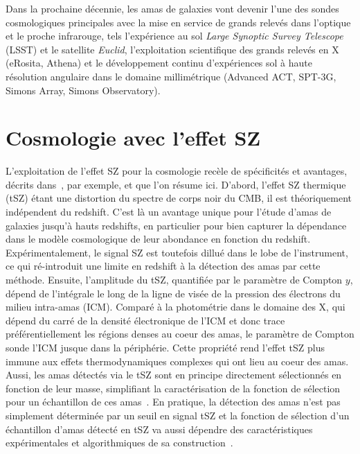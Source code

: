 Dans la prochaine décennie, les amas de galaxies vont devenir l'une
des sondes cosmologiques principales avec la mise en service de grands
relevés dans l'optique et le proche infrarouge, tels l'expérience au
sol \emph{Large Synoptic Survey Telescope} (LSST) et le satellite
\emph{Euclid}, l'exploitation scientifique des grands relevés en X
(eRosita, Athena) et le développement continu d'expériences sol à
haute résolution angulaire dans le domaine millimétrique (Advanced
ACT, SPT-3G, Simons Array, Simons Observatory). 


\section{Cosmologie avec l'effet SZ}
\label{se:cosmo_sz}

L'exploitation de l'effet SZ pour la cosmologie recèle de spécificités
et avantages, décrits dans~\citet{Carlstrom2002}, par exemple, et que
l'on résume ici. D'abord, l'effet SZ thermique (tSZ)
étant une distortion du spectre de corps noir du CMB, il est
théoriquement indépendent du redshift. C'est là un avantage unique
pour l'étude d'amas de galaxies jusqu'à hauts redshifts, en
particulier pour bien capturer la dépendance dans le modèle cosmologique de
leur abondance en fonction du redshift. Expérimentalement, le signal SZ est toutefois dillué
dans le lobe de l'instrument, ce qui ré-introduit une limite en
redshift à la détection des amas par cette méthode. Ensuite,
l'amplitude du tSZ, quantifiée par le paramètre de Compton $y$, dépend
de l'intégrale le long de la ligne de visée de la pression des
électrons du milieu intra-amas (ICM). %
Comparé à la photométrie dans le domaine des X, qui dépend du carré de la densité
électronique de l'ICM et donc trace préférentiellement les régions
denses au coeur des amas, le paramètre de Compton sonde l'ICM jusque
dans la périphérie. Cette propriété rend l'effet tSZ plus immune aux
effets thermodynamiques complexes qui ont lieu au coeur des
amas. Aussi, les amas détectés via le tSZ sont en principe directement
sélectionnés en fonction de leur masse, simplifiant la caractérisation
de la fonction de sélection pour un échantillon de ces
amas~\citep{Holder2000}. En pratique, la détection des amas n'est pas
simplement déterminée par un seuil en signal tSZ et la fonction de
sélection d'un échantillon d'amas détecté en tSZ va aussi dépendre des
caractéristiques expérimentales et algorithmiques de sa
construction~\citep{Melin2005}.

